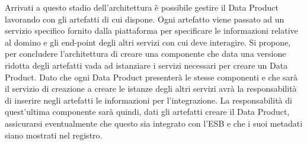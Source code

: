 \documentclass[12pt]{report}
\begin{document}
Arrivati a questo stadio dell'architettura è possibile gestire il Data Product lavorando con gli artefatti di cui dispone.
Ogni artefatto viene passato ad un servizio specifico fornito dalla piattaforma per specificare le informazioni relative al domino e gli end-point degli altri servizi con cui deve interagire.
Si propone, per concludere l'architettura di creare una componente che data una versione ridotta degli artefatti vada ad istanziare i servizi necessari per creare un Data Product.
Dato che ogni Data Product presenterà le stesse componenti e che sarà il servizio di creazione a creare le istanze degli altri servizi avrà la responsabilità di inserire negli artefatti le informazioni per l'integrazione.
La responsabilità di quest'ultima componente sarà quindi, dati gli artefatti creare il Data Product, assicurarsi eventualmente che questo sia integrato con l'ESB e che i suoi metadati siano mostrati nel registro.
\end{document}
